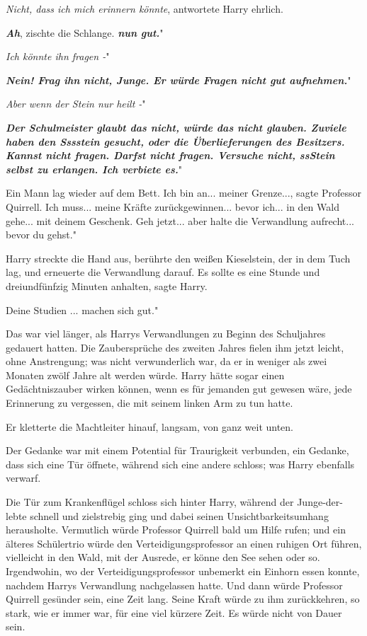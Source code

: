 \glqq \emph{Nicht, dass ich mich erinnern könnte}\grqq{}, antwortete Harry
ehrlich.

\glqq \textbf{\emph{Ah}}\grqq{}, zischte die Schlange. \glqq \textbf{\emph{nun
gut.}}"

\glqq \emph{Ich könnte ihn fragen -}"

\glqq \textbf{\emph{Nein! Frag ihn nicht, Junge. Er würde Fragen nicht gut
aufnehmen.}}"

\glqq \emph{Aber wenn der Stein nur heilt -}"

\glqq \textbf{\emph{Der Schulmeister glaubt das nicht, würde das nicht glauben.
Zuviele haben den Sssstein gesucht, oder die Überlieferungen des Besitzers.
Kannst nicht fragen. Darfst nicht fragen. Versuche nicht, ssStein selbst zu
erlangen. Ich verbiete es.}}"

Ein Mann lag wieder auf dem Bett. \glqq Ich bin an... meiner Grenze...\grqq{},
sagte Professor Quirrell. \glqq Ich muss... meine Kräfte zurückgewinnen... bevor
ich... in den Wald gehe... mit deinem Geschenk. Geh jetzt... aber halte die
Verwandlung aufrecht... bevor du gehst."

Harry streckte die Hand aus, berührte den weißen Kieselstein, der in dem Tuch
lag, und erneuerte die Verwandlung darauf. \glqq Es sollte es eine Stunde und
dreiundfünfzig Minuten anhalten\grqq{}, sagte Harry.

\glqq Deine Studien ... machen sich gut."

Das war viel länger, als Harrys Verwandlungen zu Beginn des Schuljahres gedauert
hatten. Die Zaubersprüche des zweiten Jahres fielen ihm jetzt leicht, ohne
Anstrengung; was nicht verwunderlich war, da er in weniger als zwei Monaten
zwölf Jahre alt werden würde. Harry hätte sogar einen Gedächtniszauber wirken
können, wenn es für jemanden gut gewesen wäre, jede Erinnerung zu vergessen, die
mit seinem linken Arm zu tun hatte.

Er kletterte die Machtleiter hinauf, langsam, von ganz weit unten.

Der Gedanke war mit einem Potential für Traurigkeit verbunden, ein Gedanke, dass
sich eine Tür öffnete, während sich eine andere schloss; was Harry ebenfalls
verwarf.

Die Tür zum Krankenflügel schloss sich hinter Harry, während der Junge-der-lebte
schnell und zielstrebig ging und dabei seinen Unsichtbarkeitsumhang herausholte.
Vermutlich würde Professor Quirrell bald um Hilfe rufen; und ein älteres
Schülertrio würde den Verteidigungsprofessor an einen ruhigen Ort führen,
vielleicht in den Wald, mit der Ausrede, er könne den See sehen oder so.
Irgendwohin, wo der Verteidigungsprofessor unbemerkt ein Einhorn essen konnte,
nachdem Harrys Verwandlung nachgelassen hatte. Und dann würde Professor Quirrell
gesünder sein, eine Zeit lang. Seine Kraft würde zu ihm zurückkehren, so stark,
wie er immer war, für eine viel kürzere Zeit. Es würde nicht von Dauer sein.

